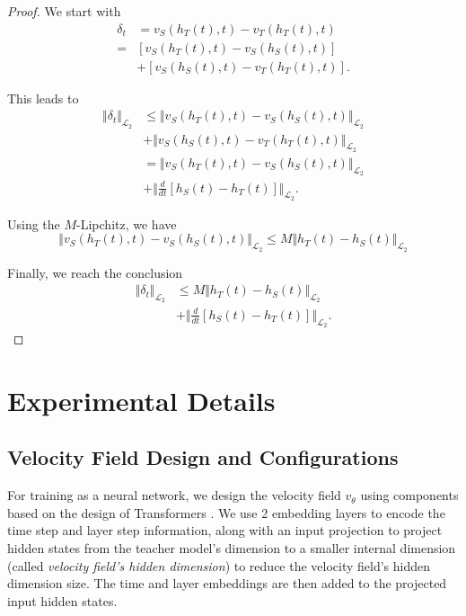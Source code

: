 \documentclass{article} %
\theoremstyle{definition}
\theoremstyle{remark}
\begin{document}
\begin{proof}
We start with    
\begin{align*}
\delta_{t} & =v_{S}\left(h_{T}\left(t\right),t\right)-v_{T}\left(h_{T}\left(t\right),t\right)\\
= & \left[v_{S}\left(h_{T}\left(t\right),t\right)-v_{S}\left(h_{S}\left(t\right),t\right)\right]\\
 & +\left[v_{S}\left(h_{S}\left(t\right),t\right)-v_{T}\left(h_{T}\left(t\right),t\right)\right].
\end{align*}

This leads to
\begin{align*}
\Vert\delta_{t}\Vert_{\mathcal{L}_{2}} & \leq\Vert v_{S}\left(h_{T}\left(t\right),t\right)-v_{S}\left(h_{S}\left(t\right),t\right)\Vert_{\mathcal{L}_{2}}\\
 & +\Vert v_{S}\left(h_{S}\left(t\right),t\right)-v_{T}\left(h_{T}\left(t\right),t\right)\Vert_{\mathcal{L}_{2}}\\
 & =\Vert v_{S}\left(h_{T}\left(t\right),t\right)-v_{S}\left(h_{S}\left(t\right),t\right)\Vert_{\mathcal{L}_{2}}\\
 & +\Vert\frac{d}{dt}\left[h_{S}\left(t\right)-h_{T}\left(t\right)\right]\Vert_{\mathcal{L}_{2}}.
\end{align*}

Using the $M$-Lipchitz, we have
\[
\Vert v_{S}\left(h_{T}\left(t\right),t\right)-v_{S}\left(h_{S}\left(t\right),t\right)\Vert_{\mathcal{L}_{2}}\leq M\Vert h_{T}\left(t\right)-h_{S}\left(t\right)\Vert_{\mathcal{L}_{2}}
\]

Finally, we reach the conclusion
\begin{align}
\Vert\delta_{t}\Vert_{\mathcal{L}_{2}} & \leq M\Vert h_{T}\left(t\right)-h_{S}\left(t\right)\Vert_{\mathcal{L}_{2}}\nonumber \\
 & +\Vert\frac{d}{dt}\left[h_{S}\left(t\right)-h_{T}\left(t\right)\right]\Vert_{\mathcal{L}_{2}}.\label{eq:delta_bound_new}
\end{align}
\end{proof}

\label{app:proof}

\section{Experimental Details}
\label{app:experiment}
\subsection{Velocity Field Design and Configurations}
For training as a neural network, we design the velocity field $v_{\theta}$ using components based on the design of Transformers \cite{vaswani2023attentionneed}. We use 2 embedding layers to encode the time step and layer step information, along with an input projection to project hidden states from the teacher model's dimension to a smaller internal dimension (called \textit{velocity field's hidden dimension}) to reduce the velocity field's hidden dimension size. The time and layer embeddings are then added to the projected input hidden states.
\end{document}
